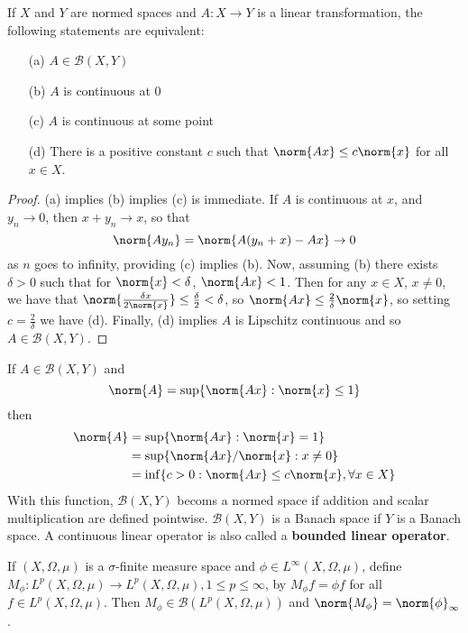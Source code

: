 \begin{prop}
    If $X$ and $Y$ are normed spaces and $A:X\rightarrow Y$ is a linear transformation, the following statements are equivalent: 
    \begin{enumerate}
        \item[(a)] $A \in \mathscr{B}(X,Y)$
        \item[(b)] $A$ is continuous at $0$
        \item[(c)] $A$ is continuous at some point
        \item[(d)] There is a positive constant $c$ such that $\norm{Ax} \leq c\norm{x}$ for all $x \in X$.
    \end{enumerate}
\end{prop}
\begin{proof}
    (a) implies (b) implies (c) is immediate. If $A$ is continuous at $x$, and $y_n\rightarrow 0$, then $x+y_n\rightarrow x$, so that $$\norm{Ay_n} = \norm{A(y_n+x)-Ax}\rightarrow 0$$
    as $n$ goes to infinity, providing (c) implies (b). Now, assuming (b) there exists $\delta > 0$ such that for $\norm{x} < \delta$, $\norm{Ax} < 1$. Then for any $x \in X$, $x \neq 0$, we have that $\norm{\frac{\delta x}{2\norm{x}}} \leq \frac{\delta}{2} < \delta$, so $\norm{Ax} \leq \frac{2}{\delta}\norm{x}$, so setting $c = \frac{2}{\delta}$ we have (d). Finally, (d) implies $A$ is Lipschitz continuous and so $A \in \mathscr{B}(X,Y)$.
\end{proof}

If $A \in \mathscr{B}(X,Y)$ and $$\norm{A} = \sup\{\norm{Ax}:\norm{x} \leq 1\}$$
then \begin{align*}
    \norm{A} &= \sup\{\norm{Ax}:\norm{x} = 1\} \\
    &= \sup\{\norm{Ax}/\norm{x}:x \neq 0\} \\
    &= \inf\{c > 0:\norm{Ax}\leq c\norm{x},\forall x \in X\}
\end{align*}
With this function, $\mathscr{B}(X,Y)$ becoms a normed space if addition and scalar multiplication are defined pointwise. $\mathscr{B}(X,Y)$ is a Banach space if $Y$ is a Banach space. A continuous linear operator is also called a \textbf{bounded linear operator}.

\begin{eg}
    If $(X,\Omega,\mu)$ is a $\sigma$-finite measure space and $\phi \in L^{\infty}(X,\Omega,\mu)$, define $M_{\phi}:L^p(X,\Omega,\mu)\rightarrow L^p(X,\Omega,\mu), 1\leq p \leq \infty$, by $M_{\phi}f = \phi f$ for all $f \in L^p(X,\Omega,\mu)$. Then $M_{\phi} \in \mathscr{B}(L^p(X,\Omega,\mu))$ and $\norm{M_{\phi}} = \norm{\phi}_{\infty}$.
\end{eg}

